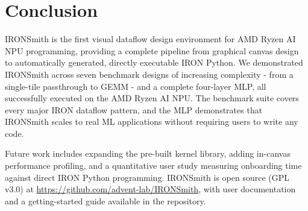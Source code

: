 \section{Conclusion} \label{sec:conclusion}
\vspace{-3mm}

IRONSmith is the first visual dataflow design environment for AMD Ryzen AI NPU programming, providing a complete pipeline from graphical canvas design to automatically generated, directly executable IRON Python. We demonstrated IRONSmith across seven benchmark designs of increasing complexity - from a single-tile passthrough to GEMM - and a complete four-layer MLP, all successfully executed on the AMD Ryzen AI NPU. The benchmark suite covers every major IRON dataflow pattern, and the MLP demonstrates that IRONSmith scales to real ML applications without requiring users to write any code.

Future work includes expanding the pre-built kernel library, adding in-canvas performance profiling, and a quantitative user study measuring onboarding time against direct IRON Python programming. IRONSmith is open source (GPL v3.0) at \url{https://github.com/advent-lab/IRONSmith}, with user documentation and a getting-started guide available in the repository.
